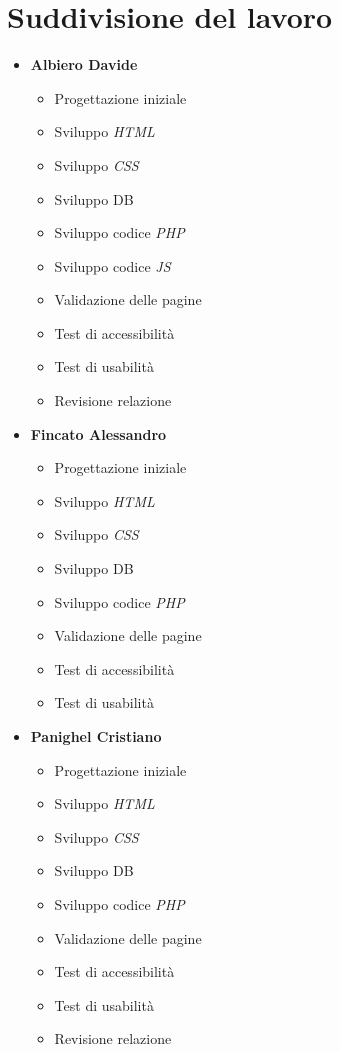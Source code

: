 \section{Suddivisione del lavoro}
\begin{itemize}
	\item \textbf{Albiero Davide}
	\begin{itemize}
		\item Progettazione iniziale
		\item Sviluppo \emph{HTML}
		\item Sviluppo \emph{CSS}
		\item Sviluppo DB
		\item Sviluppo codice \emph{PHP}
		\item Sviluppo codice \emph{JS}
		\item Validazione delle pagine
		\item Test di accessibilità
		\item Test di usabilità
		\item Revisione relazione
	\end{itemize}
	\item \textbf{Fincato Alessandro}
	\begin{itemize}
		\item Progettazione iniziale
		\item Sviluppo \emph{HTML}
		\item Sviluppo \emph{CSS}
		\item Sviluppo DB
		\item Sviluppo codice \emph{PHP}
		\item Validazione delle pagine
		\item Test di accessibilità
		\item Test di usabilità
	\end{itemize}
	\item \textbf{Panighel Cristiano}
	\begin{itemize}
		\item Progettazione iniziale
		\item Sviluppo \emph{HTML}
		\item Sviluppo \emph{CSS}
		\item Sviluppo DB
		\item Sviluppo codice \emph{PHP}
		\item Validazione delle pagine
		\item Test di accessibilità
		\item Test di usabilità
		\item Revisione relazione

\end{itemize}
\end{itemize}
